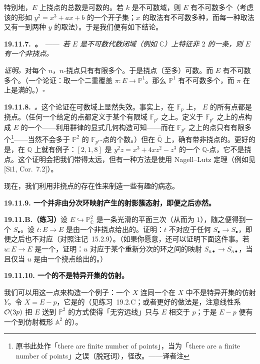 特别地，$E$ 上挠点的总数是可数的。若 $k$ 是不可数域，则 $E$ 有不可数多个\trClosedPoint（考虑该\trCurve{}的形如 $y^2=x^3+ax+b$ 的一个开子集；$x$ 的取法有不可数多种，而每一种取法又有一到两种 $y$ 的取法）。于是我们便有如下结论。

\textbf{19.11.7.\ \trhCorollary。}\ ——\ \emph{若 $E$ 是不可数代数闭域（例如 $\mathbb{C}$）上特征非 $2$ 的一条\trCurve，则 $E$ 有一个非挠点。}

\emph{证明。}\quad 对每个 $n$，$n$-挠点只有有限多个。于是挠点（至多）可数。而\trCurve{} $E$ 有不可数多个\trClosedPoint。（一个论证：取一个二重覆盖 $\pi\colon E\to\mathbb{P}^1$。那么 $\mathbb{P}^1$ 有不可数多个\trClosedPoint，而 $\pi$ 在\trClosedPoint{}上是满的。）\hfill$\square$

\textbf{19.11.8.}\ \emph{\trhRemark{}。}\quad 这个论证在可数域上显然失效。事实上，在 $\mathbb{F}_p$ 上，\trEllipticCurve{} $E$ 的所有点都是挠点。（任何一个给定的点都定义于某个有限域 $\mathbb{F}_{p^r}$ 之上。定义于 $\mathbb{F}_{p^r}$ 之上的点构成 $E$ 的一个\trSubgroup——利用群律的显式几何构造可知——而在 $\mathbb{F}_{p^r}$ 之上的点只有有限多个\footnote{原书此处作「there are finite number of points」，当为「there are a finite number of points」之误（脱冠词），径改。——译者注}——当然不会多于 $\mathbb{P}^2$ 的 $\mathbb{F}_{p^r}$-点的个数。）但在 $\bar{\mathbb{Q}}$ 上，确有带非挠点的\trEllipticCurve。更好的是，在 $\mathbb{Q}$ 上就有例子：$[2,1,8]$ 是\trEllipticCurve{} $y^2z=x^3+4xz^2-z^3$ 的一个 $\mathbb{Q}$-点，它不是挠点。这个证明会把我们带得太远，但有一种方法是使用 Nagell--Lutz 定理（例如见 [Si1, Cor.~7.2]）。

现在，我们利用非挠点的存在性来制造一些有趣的病态。

\textbf{19.11.9. 一个并非由分次环映射产生的射影簇态射，即便\trRegrading{}之后亦然。}

\textbf{19.11.B.（练习）}\quad 设 $E\hookrightarrow\mathbb{P}^2_{\mathbb{C}}$ 是一条光滑的\trComplex{}平面三次\trCurve（从而\trGenus{}为 $1$），随之便得到一个\trGradedRing{} $S_\bullet$。设 $t\colon E\to E$ 是由一个非挠点给出的\trTranslation。证明：$t$ 不对应于任何\trGradedRingMap{} $S_\bullet\to S_\bullet$，即便\trRegrading{}之后也不对应（对照\mbox{注记~15.2.9}）。（如果你愿意，还可以证明下面这件事。若 $u\colon E\to E$ 是一个\trTranslation，证明：$u$ 对应于某个重新分次的环之间的映射 $S_{n\bullet}\to S_{n\bullet}$，当且仅当 $u$ 是由一个挠点给出的\trTranslation。）

\textbf{19.11.10. 一个\trAffine\trScheme{}的不是特异开集的仿射\trOpenSubset。}

我们可以用这一点来构造一个例子：一个\trAffine\trScheme{} $X$ 连同一个在 $X$ 中不是特异开集的仿射\trOpenSubset{} $Y$。令 $X=E-p$，它是\trAffine{}的（见\mbox{练习~19.2.C}；或者更好的做法是，注意线性系 $\mathcal{O}(3p)$ 把 $E$ 送到 $\mathbb{P}^2$ 的方式使得「无穷远线」只与 $E$ 相交于 $p$；于是 $E-p$ 便有一个到仿射概形 $\mathbb{A}^2$ 的\trClosedEmbedding）。

